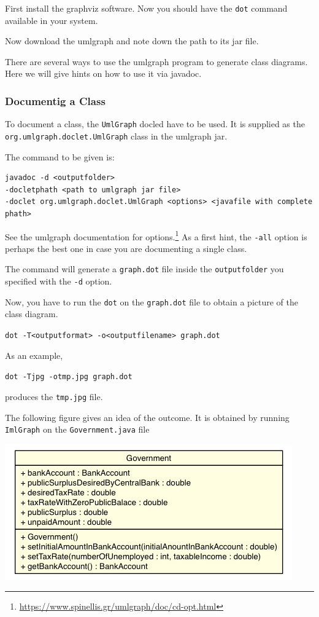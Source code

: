 \documentclass{book}
\begin{document}
First install the graphviz software. Now you should have the \verb+dot+ command available in your system.

Now download the umlgraph and note down the path to its jar file.

There are several ways to use the umlgraph program to generate class diagrams. Here we will give hints on how to use it via javadoc.

\subsubsection{Documentig a Class}

To document a class, the \verb+UmlGraph+ docled have to be used. It is supplied as the \verb+org.umlgraph.doclet.UmlGraph+ class in the umlgraph jar.

The command to be given is:

\begin{verbatim}
javadoc -d <outputfolder> 
-docletphath <path to umlgraph jar file>
-doclet org.umlgraph.doclet.UmlGraph <options> <javafile with complete phath>
\end{verbatim}

See the umlgraph documentation for options.\footnote{\url{https://www.spinellis.gr/umlgraph/doc/cd-opt.html}} As a first hint, the \verb+-all+ option is perhaps the best one in case you are documenting a single class. 

The command will generate a \verb+graph.dot+ file inside the \verb+outputfolder+ you specified with the \verb+-d+ option.

Now, you have to run the \verb+dot+ on the \verb+graph.dot+ file to obtain a picture of the class diagram.


\verb+dot -T<outputformat> -o<outputfilename> graph.dot+

As an example,

\verb+dot -Tjpg -otmp.jpg graph.dot+

produces the \verb+tmp.jpg+ file.

The following figure gives an idea of the outcome. It is obtained by running \verb+ImlGraph+ on the \verb+Government.java+ file

\includegraphics[scale=0.5]{../umlgraph/government_class_diagram.jpg}
\end{document}
